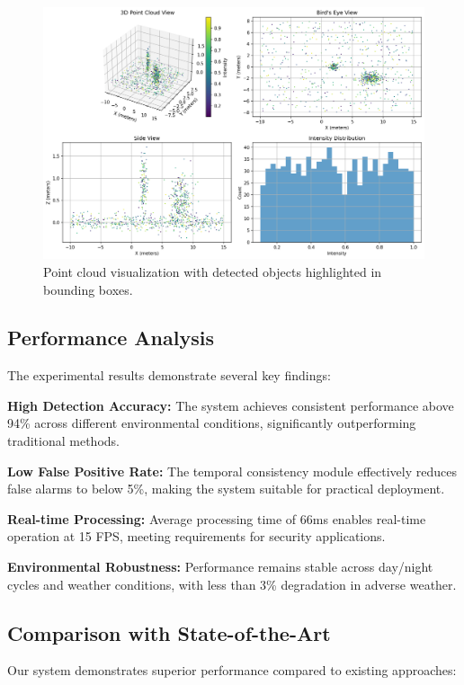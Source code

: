 \documentclass[conference]{IEEEtran}
\begin{document}
\begin{figure}[htbp]
\centering
\includegraphics[width=\columnwidth]{point_cloud_visualization.png}
\caption{Point cloud visualization with detected objects highlighted in bounding boxes.}
\label{fig:pointcloud}
\end{figure}

\subsection{Performance Analysis}
The experimental results demonstrate several key findings:

\textbf{High Detection Accuracy:} The system achieves consistent performance above 94\% across different environmental conditions, significantly outperforming traditional methods.

\textbf{Low False Positive Rate:} The temporal consistency module effectively reduces false alarms to below 5\%, making the system suitable for practical deployment.

\textbf{Real-time Processing:} Average processing time of 66ms enables real-time operation at 15 FPS, meeting requirements for security applications.

\textbf{Environmental Robustness:} Performance remains stable across day/night cycles and weather conditions, with less than 3\% degradation in adverse weather.

\subsection{Comparison with State-of-the-Art}
Our system demonstrates superior performance compared to existing approaches:
\end{document}
